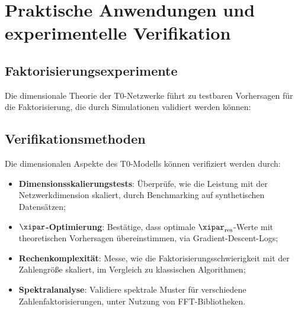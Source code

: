 \section{Praktische Anwendungen und experimentelle Verifikation}
\label{sec:practical_applications}
\subsection{Faktorisierungsexperimente}
\label{subsec:factorization_experiments}
Die dimensionale Theorie der T0-Netzwerke führt zu testbaren Vorhersagen für die Faktorisierung, die durch Simulationen validiert werden können:
\begin{table}[htbp]
	\centering
	\caption{Faktorisierungsvorhersagen aus der dimensionalen T0-Theorie, erweitert um Validierungsmetriken}
	\label{tab:factorization_predictions}
\end{table}
\subsection{Verifikationsmethoden}
\label{subsec:verification_methods}
Die dimensionalen Aspekte des T0-Modells können verifiziert werden durch:
\begin{itemize}
	\item \textbf{Dimensionsskalierungstests}: Überprüfe, wie die Leistung mit der Netzwerkdimension skaliert, durch Benchmarking auf synthetischen Datensätzen;
	\item \textbf{$\xipar$-Optimierung}: Bestätige, dass optimale $\xipar_{\text{res}}$-Werte mit theoretischen Vorhersagen übereinstimmen, via Gradient-Descent-Logs;
	\item \textbf{Rechenkomplexität}: Messe, wie die Faktorisierungsschwierigkeit mit der Zahlengröße skaliert, im Vergleich zu klassischen Algorithmen;
	\item \textbf{Spektralanalyse}: Validiere spektrale Muster für verschiedene Zahlenfaktorisierungen, unter Nutzung von FFT-Bibliotheken.
\end{itemize}
